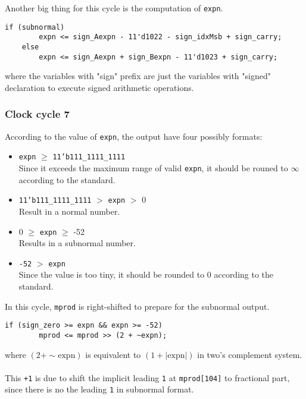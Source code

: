 \documentclass{article}
\begin{document}
                Another big thing for this cycle is the computation of {\tt expn}.
                \begin{lstlisting}[style = verilog-style]
    if (subnormal)
        expn <= sign_Aexpn - 11'd1022 - sign_idxMsb + sign_carry;
    else
        expn <= sign_Aexpn + sign_Bexpn - 11'd1023 + sign_carry;
                \end{lstlisting}
                where the variables with "sign" prefix are just the variables with "signed" declaration to execute signed arithmetic operations.

            \subsubsection*{Clock cycle 7}
                According to the value of {\tt expn}, the output have four possibly formats:
                \begin{itemize}
                    \item {\tt expn} $\geq$ {\tt 11'b111\_1111\_1111} \\
                    Since it exceeds the maximum range of valid {\tt expn}, it should be rouned to $\infty$ according to the standard.
                    \item {\tt 11'b111\_1111\_1111} $>$ {\tt expn} $>$ 0 \\
                    Result in a normal number.
                    \item 0 $\geq$ {\tt expn} $\geq$ -52 \\
                    Results in a subnormal number.
                    \item {\tt -52} $>$ {\tt expn} \\
                    Since the value is too tiny, it should be rounded to 0 according to the standard.
                \end{itemize}

                In this cycle, {\tt mprod} is right-shifted to prepare for the subnormal output.
                \begin{lstlisting}[style = verilog-style]
    if (sign_zero >= expn && expn >= -52)
        mprod <= mprod >> (2 + ~expn);
                \end{lstlisting}
                where $(2 +\sim\mathrm{expn})$ is equivalent to $(1+|\mathrm{expn}|)$ in two's complement system. \\\\
                This {\tt +1} is due to shift the implicit leading {\tt 1} at {\tt mprod[104]} to fractional part, since there is no the leading {\tt 1} in subnormal format.
\end{document}
